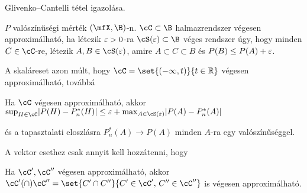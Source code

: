 \documentclass[aspectratio=169,notheorems,9pt,\option]{beamer}
\begin{document}
\begin{frame}{Glivenko--Cantelli tétel igazolása}.
  \begin{df}
    $P$ valószínűségi mérték $(\mfX ,\B)$-n.
    $\cC\subset\B$ halmazrendszer végesen approximálható, ha létezik $\varepsilon>0$-ra
    $\cS (\eps)\subset\B$ véges rendszer úgy, hogy minden $C\in\cC$-re, 
    létezik $A,B\in\cS (\eps)$, amire $A\subset C\subset B$ és
    $P(B)\le  P(A)+\varepsilon$.
  \end{df}
  \continue
  A skaláreset azon múlt, hogy $\cC=\set{(-\infty,t)}{t\in\real}$ végesen approximálható, továbbá
  \begin{proposition}
    Ha $\cC$ végesen approximálható, akkor
      $\sup_{H\in\cC}\abs*{P (H)-P^*_n (H)}\leq
      \eps + \max_{A\in\cS (\eps)}  \abs*{P(A)-P^*_n (A)}$
  \end{proposition}
  és a tapasztalati eloszlásra $P_n^*(A)\to P(A)$ minden $A$-ra egy valószínűséggel.
  
  \continue
  A vektor esethez csak annyit kell hozzátenni, hogy
  \begin{proposition}
    Ha $\cC',\cC''$ végesen approximálható, akkor
     $\cC' (\cap)\cC''=\set{C'\cap C''}{C'\in\cC',\,C''\in\cC''}$ is végesen approximálható.
  \end{proposition}  
\end{frame}
\end{document}
